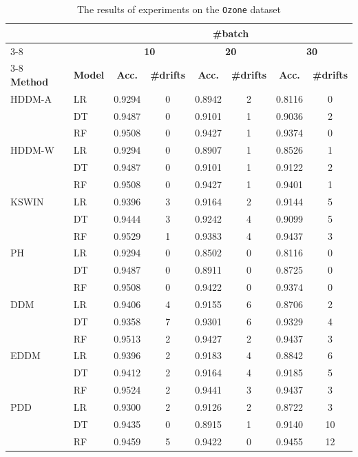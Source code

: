 \documentclass[pdflatex,sn-mathphys-ay]{sn-jnl}%
\theoremstyle{thmstyleone}%
\theoremstyle{thmstyletwo}%
\theoremstyle{thmstylethree}%
\begin{document}
\begin{table}[h]
    \centering
    \scriptsize
    \caption{The results of experiments on the \texttt{Ozone} dataset}
    \label{tab:exp_Ozone}
    \begin{tabular}{llcccccc}\toprule
        && \multicolumn{6}{c}{\textbf{\#batch}}\\\cmidrule(lr){3-8}
        && \multicolumn{2}{c}{\textbf{10}} & \multicolumn{2}{c}{\textbf{20}} & \multicolumn{2}{c}{\textbf{30}} \\\cmidrule(lr){3-8}
        \textbf{Method} & \textbf{Model} & \textbf{Acc.} & \textbf{\#drifts} & \textbf{Acc.} & \textbf{\#drifts} & \textbf{Acc.} & \textbf{\#drifts} \\\midrule
        HDDM-A & LR & 0.9294 & 0  & 0.8942 & 2  & 0.8116 & 0 \\
               & DT & 0.9487 & 0  & 0.9101 & 1  & 0.9036 & 2 \\
               & RF & 0.9508 & 0  & 0.9427 & 1  & 0.9374 & 0 \\\midrule
        HDDM-W & LR & 0.9294 & 0  & 0.8907 & 1  & 0.8526 & 1 \\
               & DT & 0.9487 & 0  & 0.9101 & 1  & 0.9122 & 2 \\
               & RF & 0.9508 & 0  & 0.9427 & 1  & 0.9401 & 1 \\\midrule
        KSWIN  & LR & 0.9396 & 3  & 0.9164 & 2  & 0.9144 & 5 \\
               & DT & 0.9444 & 3  & 0.9242 & 4  & 0.9099 & 5 \\
               & RF & 0.9529 & 1  & 0.9383 & 4  & 0.9437 & 3 \\\midrule
        PH     & LR & 0.9294 & 0  & 0.8502 & 0  & 0.8116 & 0 \\
               & DT & 0.9487 & 0  & 0.8911 & 0  & 0.8725 & 0 \\
               & RF & 0.9508 & 0  & 0.9422 & 0  & 0.9374 & 0 \\\midrule
        DDM    & LR & 0.9406 & 4  & 0.9155 & 6  & 0.8706 & 2 \\
               & DT & 0.9358 & 7  & 0.9301 & 6  & 0.9329 & 4 \\
               & RF & 0.9513 & 2  & 0.9427 & 2  & 0.9437 & 3 \\\midrule
        EDDM   & LR & 0.9396 & 2  & 0.9183 & 4  & 0.8842 & 6 \\
               & DT & 0.9412 & 2  & 0.9164 & 4  & 0.9185 & 5 \\
               & RF & 0.9524 & 2  & 0.9441 & 3  & 0.9437 & 3 \\\midrule
        PDD    & LR & 0.9300 & 2  & 0.9126 & 2  & 0.8722 & 3 \\
               & DT & 0.9435 & 0  & 0.8915 & 1  & 0.9140 & 10 \\
               & RF & 0.9459 & 5  & 0.9422 & 0  & 0.9455 & 12 \\\bottomrule
    \end{tabular}
\end{table}
\end{document}

